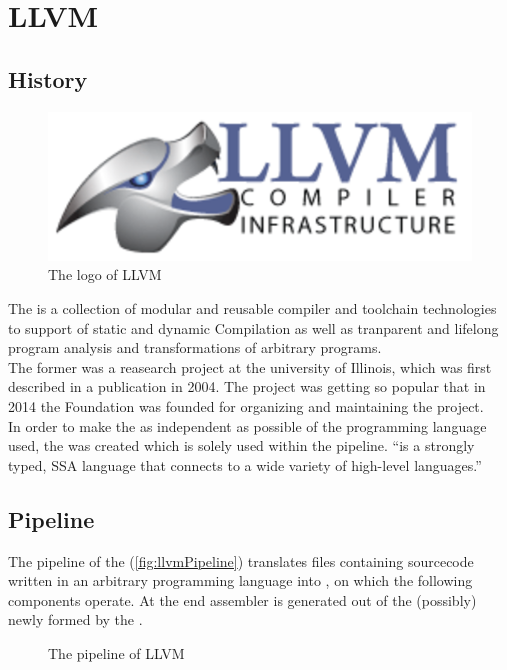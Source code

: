 \chapter{LLVM}
\section{History}
\begin{figure}
    \caption[The logo of LLVM]{The logo of LLVM \cite{llvmLogo}}
    \includegraphics[width=.5\textwidth]{gfx/llvmLogo.png}
\end{figure}
The \llvm is a collection of modular and reusable compiler and toolchain technologies to support of static and dynamic Compilation as well as tranparent and lifelong program analysis and transformations of arbitrary programs. \cite{LLVMWebsite, LLVMResearchBeginning}\\
The \llvm former was a reasearch project at the university of Illinois, which was first described in a publication in 2004.
The project was getting so popular that in 2014 the \llvm Foundation was founded for organizing and maintaining the project. \cite{LLVMFoundation}\\
In order to make the \llvm as independent as possible of the programming language used, the \llvmir was created which is solely used within the pipeline.
\enquote{\llvmir is a strongly typed, \ac{SSA} language that connects to a wide variety of high-level languages.} \cite{PolyhedralEmpiricalStudy}

\section{Pipeline}
The pipeline of the \llvm (\autoref{fig:llvmPipeline}) translates files containing sourcecode written in an arbitrary programming language into \llvmir, on which the following components operate.
At the end assembler is generated out of the (possibly) newly formed \llvmir by the \generator. \cite{IntroLLVM}
\begin{figure}[!ht]
    \caption{The pipeline of LLVM}
    \label{fig:llvmPipeline}
    \centering
    \legend
\end{figure}\\
